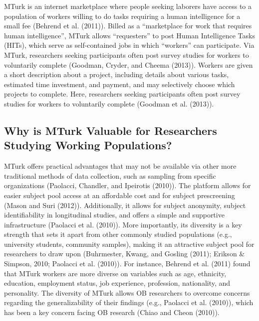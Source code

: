\documentclass[english,man]{apa6}
\theoremstyle{definition}
\theoremstyle{definition}
\theoremstyle{remark}
\begin{document}
MTurk is an internet marketplace where people seeking laborers have
access to a population of workers willing to do tasks requiring a human
intelligence for a small fee (Behrend et al. (2011)). Billed as a
\enquote{marketplace for work that requires human intelligence}, MTurk
allows \enquote{requesters} to post Human Intelligence Tasks (HITs),
which serve as self-contained jobs in which \enquote{workers} can
participate. Via MTurk, researchers seeking participants often post
survey studies for workers to voluntarily complete (Goodman, Cryder, and
Cheema (2013)). Workers are given a short description about a project,
including details about various tasks, estimated time investment, and
payment, and may selectively choose which projects to complete. Here,
researchers seeking participants often post survey studies for workers
to voluntarily complete (Goodman et al. (2013)).

\subsection{Why is MTurk Valuable for Researchers Studying Working
Populations?}\label{why-is-mturk-valuable-for-researchers-studying-working-populations}

MTurk offers practical advantages that may not be available via other
more traditional methods of data collection, such as sampling from
specific organizations (Paolacci, Chandler, and Ipeirotis (2010)). The
platform allows for easier subject pool access at an affordable cost and
for subject prescreening (Mason and Suri (2012)). Additionally, it
allows for subject anonymity, subject identifiability in longitudinal
studies, and offers a simple and supportive infrastructure (Paolacci et
al. (2010)). More importantly, its diversity is a key strength that sets
it apart from other commonly studied populations (e.g., university
students, community samples), making it an attractive subject pool for
researchers to draw upon (Buhrmester, Kwang, and Gosling (2011); Erikson
\& Simpson, 2010; Paolacci et al. (2010)). For instance, Behrend et al.
(2011) found that MTurk workers are more diverse on variables such as
age, ethnicity, education, employment status, job experience,
profession, nationality, and personality. The diversity of MTurk allows
OB researchers to overcome concerns regarding the generalizability of
their findings (e.g., Paolacci et al. (2010)), which has been a key
concern facing OB research (Chiao and Cheon (2010)).
\end{document}
